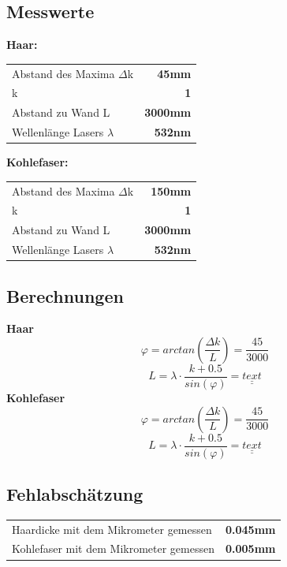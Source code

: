 \documentclass{article}
\begin{document}
\subsection{Messwerte}

\textbf{Haar:}

\begin{tabular}{l r}
	Abstand des Maxima $\Delta$k & \textbf{45mm}\\
	k	&\textbf{1}\\
	Abstand zu Wand L&\textbf{3000mm} \\
	Wellenlänge Lasers $\lambda$ & \textbf{532nm}
\end{tabular}

\textbf{Kohlefaser:}

\begin{tabular}{l r}
	Abstand des Maxima $\Delta$k & \textbf{150mm}\\
	k	&\textbf{1}\\
	Abstand zu Wand L&\textbf{3000mm}\\
	Wellenlänge Lasers $\lambda$ & \textbf{532nm}
\end{tabular}

\subsection{Berechnungen}
\textbf{Haar}
\begin{equation}
\varphi = arctan(\frac{\Delta k}{L}) = \frac{45}{3000}
\end{equation}
\begin{equation}
L = \lambda \cdot \frac{k+0.5}{sin(\varphi)}= \underline{\underline{text}} 
\end{equation}
\textbf{Kohlefaser}
\begin{equation}
\varphi = arctan(\frac{\Delta k}{L}) = \frac{45}{3000}
\end{equation}
\begin{equation}
L = \lambda \cdot \frac{k+0.5}{sin(\varphi)}= \underline{\underline{text}} 
\end{equation}
\subsection{Fehlabschätzung}
\begin{tabular}{l r}
	Haardicke mit dem Mikrometer gemessen & \textbf{0.045mm}\\
	Kohlefaser mit dem Mikrometer gemessen	&\textbf{0.005mm}\\
\end{tabular}
\vspace{3mm}
\end{document}

